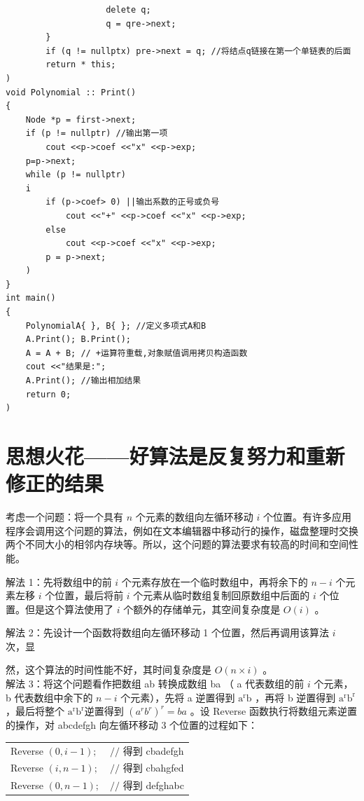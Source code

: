 \documentclass[10pt]{article}
\begin{document}
\begin{verbatim}
                    delete q;
                    q = qre->next;
        }
        if (q != nullptx) pre->next = q; //将结点q链接在第一个单链表的后面
        return * this;
)
void Polynomial :: Print()
{
    Node *p = first->next;
    if (p != nullptr) //输出第一项
        cout <<p->coef <<"x" <<p->exp;
    p=p->next;
    while (p != nullptr)
    i
        if (p->coef> 0) ||输出系数的正号或负号
            cout <<"+" <<p->coef <<"x" <<p->exp;
        else
            cout <<p->coef <<"x" <<p->exp;
        p = p->next;
    )
}
int main()
{
    PolynomialA{ }, B{ }; //定义多项式A和B
    A.Print(); B.Print();
    A = A + B; // +运算符重载,对象赋值调用拷贝构造函数
    cout <<"结果是:";
    A.Print(); //输出相加结果
    return 0;
)
\end{verbatim}

\section*{思想火花——好算法是反复努力和重新修正的结果}
考虑一个问题：将一个具有 $n$ 个元素的数组向左循环移动 $i$ 个位置。有许多应用程序会调用这个问题的算法，例如在文本编辑器中移动行的操作，磁盘整理时交换两个不同大小的相邻内存块等。所以，这个问题的算法要求有较高的时间和空间性能。

解法 1：先将数组中的前 $i$ 个元素存放在一个临时数组中，再将余下的 $n-i$ 个元素左移 $i$ 个位置，最后将前 $i$ 个元素从临时数组复制回原数组中后面的 $i$ 个位置。但是这个算法使用了 $i$ 个额外的存储单元，其空间复杂度是 $O(i)$ 。

解法 2：先设计一个函数将数组向左循环移动 1 个位置，然后再调用该算法 $i$ 次，显

然，这个算法的时间性能不好，其时间复杂度是 $O(n \times i)$ 。\\
解法 3：将这个问题看作把数组 ab 转换成数组 ba （ a 代表数组的前 $i$ 个元素， b 代表数组中余下的 $n-i$ 个元素），先将 a 逆置得到 $\mathrm{a}^{\mathrm{r}} \mathrm{b}$ ，再将 b 逆置得到 $\mathrm{a}^{\mathrm{r}} \mathrm{b}^{\mathrm{r}}$ ，最后将整个 $\mathrm{a}^{\mathrm{r}} \mathrm{b}^{\mathrm{r}}$逆置得到 $\left(a^{r} b^{r}\right)^{r}=b a$ 。设 Reverse 函数执行将数组元素逆置的操作，对 abcdefgh 向左循环移动 3 个位置的过程如下：

\begin{center}
\begin{tabular}{ll}
Reverse $(0, i-1) ;$ & $/ /$ 得到 cbadefgh \\
Reverse $(i, n-1) ;$ & $/ /$ 得到 cbahgfed \\
Reverse $(0, n-1) ;$ & $/ /$ 得到 defghabc \\
\hline
\end{tabular}
\end{center}
\end{document}
